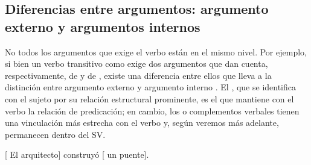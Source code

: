 \subsection{Diferencias entre argumentos: argumento externo y argumentos internos}\label{sec:06-externo}

No todos los argumentos que exige el verbo están en el mismo nivel. Por
ejemplo, si bien un verbo transitivo como  exige dos argumentos
que dan cuenta, respectivamente, de  y de  , existe una diferencia entre ellos que lleva
a la distinción entre argumento externo y argumento interno
\parencite{williams1980}. El , que se identifica con
el sujeto por su relación estructural prominente, es el que mantiene con el
verbo la relación de predicación; en cambio, los  o
complementos verbales tienen una vinculación más estrecha con el verbo y, según
veremos más adelante, permanecen dentro del SV.

\begin{exe}
  \ex\label{ex:06-arquitecto} {}[ El arquitecto] construyó
      [ un puente].
\end{exe}

